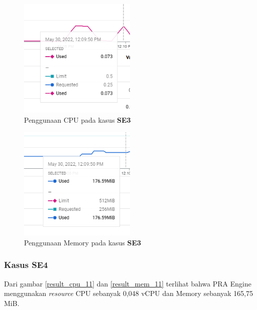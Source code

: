 \begin{figure}[!htb]
	\centering
	\includegraphics[width=0.5\textwidth]{resources/ch4/resource/10-cpu.png}
	\caption{Penggunaan CPU pada kasus \textbf{SE3}}
	\label{result_cpu_10}
\end{figure}

\begin{figure}[!htb]
	\centering
	\includegraphics[width=0.5\textwidth]{resources/ch4/resource/10-mem.png}
	\caption{Penggunaan Memory pada kasus \textbf{SE3}}
	\label{result_mem_10}
\end{figure}

\pagebreak


\subsubsection{Kasus SE4}
Dari gambar \ref{result_cpu_11} dan \ref{result_mem_11} terlihat bahwa PRA Engine menggunakan \textit{resource} CPU sebanyak 0,048 vCPU dan Memory sebanyak 165,75 MiB. 

